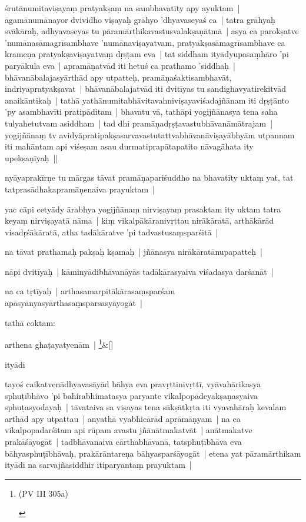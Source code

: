 \documentclass[article,a4paper]{memoir}
\begin{document}
	  \pstart śrutā\-numitaviṣayaṃ pratyakṣaṃ na sambhavatī\-ty apy ayuktam | ā\-gamā\-numā\-nayor dvividho viṣayaḥ grā\-hyo 'dhyavaseyaś ca | tatra grā\-hyaḥ svā\-kā\-raḥ, adhyavaseyas tu pā\-ramā\-rthikavastusvalakṣaṇā\-tmā\- | asya ca parokṣatve 'numā\-nasā\-magrī\-sambhave 'numā\-naviṣayatvam, pratyakṣasā\-magrī\-sambhave ca krameṇa pratyakṣaviṣayatvaṃ dṛṣṭam eva | tat siddham ityā\-dyupasaṃhā\-ro 'pi paryā\-kula eva | apramā\-ṇatvā\-d iti hetuś ca prathamo 'siddhaḥ | bhā\-vanā\-balajasyā\-rthā\-d apy utpatteḥ, pramā\-ṇaśaktisambhavā\-t, indriyapratyakṣavat | bhā\-vanā\-balajatvā\-d iti dvitī\-yas tu sandighavyatirekitvā\-d anaikā\-ntikaḥ | tathā\- yathā\-numitabhā\-vitavahniviṣayaviśadajñā\-nam iti dṛṣṭā\-nto 'py asambhavī\-ti pratipā\-ditam | bhavatu vā\-, tathā\-pi yogijñā\-nasya tena saha tulyahetutvam asiddham | tad dhi pramā\-ṇadṛṣṭavastubhā\-vanā\-mā\-trajam | yogijñā\-naṃ tv avidyā\-pratipakṣasarvavastutattvabhā\-vanā\-viṣayā\-bhyā\-m utpannam iti mahā\-ntam api viśeṣam asau durmatiprapā\-tapatito nā\-vagā\-hata ity upekṣaṇī\-yaḥ || 
	\pend
      

	  \pstart nyā\-yaprakī\-rṇe tu mā\-rgas tā\-vat pramā\-ṇapariśuddho na bhavatī\-ty uktaṃ yat, tat tatprasā\-dhakapramā\-ṇenaiva prayuktam | 
	\pend
      

	  \pstart yac cā\-pi cetyā\-dy ā\-rabhya yogijñā\-naṃ nirviṣayaṃ prasaktam ity uktam tatra keyaṃ nirviṣayatā\- nā\-ma | kiṃ vikalpā\-kā\-ranivṛttau nirā\-kā\-ratā\-, arthā\-kā\-rā\-d visadṛśā\-kā\-ratā\-, atha tadā\-kā\-ratve 'pi tadvastusaṃsparśitā\- | 
	\pend
      

	  \pstart na tā\-vat prathamaḥ pakṣaḥ kṣamaḥ | jñā\-nasya nirā\-kā\-ratā\-nupapatteḥ | 
	\pend
      

	  \pstart nā\-pi dvitī\-yaḥ | kā\-minyā\-dibhā\-vanā\-yā\-s tadā\-kā\-rasyaiva viśadasya darśanā\-t | 
	\pend
      

	  \pstart na ca tṛtī\-yaḥ | arthasamarpitā\-kā\-rasaṃsparśam apā\-syā\-nyasyā\-rthasaṃsparsasyā\-yogā\-t | 
	\pend
      

	  \pstart tathā\- coktam:
	\pend
      
	    
	    \stanza[\smallbreak]
arthena ghaṭayatyenā\-m | \footnote{\begin{english}(PV III 305a)\end{english}}\&[\smallbreak]


	

	  \pstart ityā\-di
	\pend
      

	  \pstart tayoś caikatvenā\-dhyavasā\-yā\-d bā\-hya eva pravṛttinivṛttī\-, vyā\-vahā\-rikasya sphuṭī\-bhā\-vo 'pi bahirabhimatasya paryante vikalpopā\-deyakṣaṇasyaiva sphuṭasyodayaḥ | tā\-vataiva sa viṣayas tena sā\-kṣā\-tkṛta iti vyavahā\-raḥ kevalam arthā\-d apy utpattau | anyathā\- vyabhicā\-rā\-d aprā\-mā\-ṇyam | na ca vikalpopadarśitam api rū\-pam avastu jñā\-nā\-tmakatvā\-t | anā\-tmakatve prakā\-śā\-yogā\-t | tadbhā\-vanaiva cā\-rthabhā\-vanā\-, tatsphuṭī\-bhā\-va eva bā\-hyasphuṭī\-bhā\-vaḥ, prakā\-rā\-ntareṇa bā\-hyasparśā\-yogā\-t | etena yat pā\-ramā\-rthikam ityā\-di na sarvajñasiddhir itiparyantaṃ prayuktam | 
	\pend
      
\end{document}
